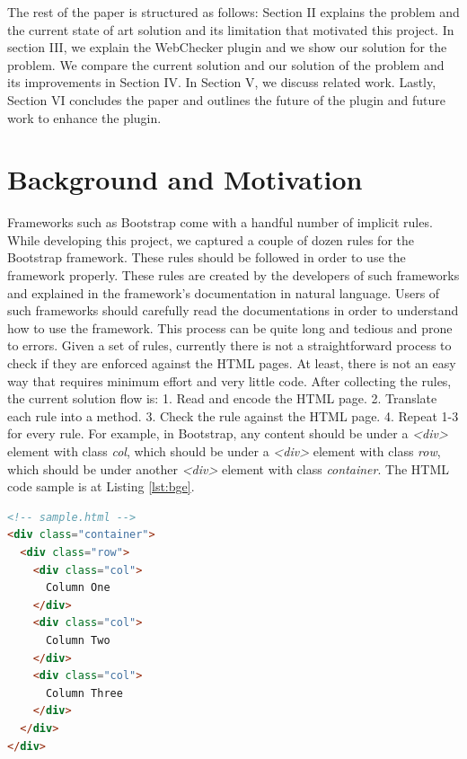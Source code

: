 \documentclass[conference]{IEEETran}
\begin{document}
The rest of the paper is structured as follows: Section II explains the problem and the current state of art solution and its limitation that motivated this project. In section III, we explain the WebChecker plugin and we show our solution for the problem. We compare the current solution and our solution of the problem and its improvements in Section IV. In Section V, we discuss related work. Lastly, Section VI concludes the paper and outlines the future of the plugin and future work to enhance the plugin.  

\section{Background and Motivation}

Frameworks such as Bootstrap come with a handful number of implicit rules. While developing this project, we captured a couple of dozen rules for the Bootstrap framework. These rules should be followed in order to use the framework properly. These rules are created by the developers of such frameworks and explained in the framework’s documentation in natural language. Users of such frameworks should carefully read the documentations in order to understand how to use the framework. This process can be quite long and tedious and prone to errors. Given a set of rules, currently there is not a straightforward process to check if they are enforced against the HTML pages. At least, there is not an easy way that requires minimum effort and very little code. After collecting the rules, the current solution flow is:
1. Read and encode the HTML page. 
2. Translate each rule into a method. 
3. Check the rule against the HTML page.
4. Repeat 1-3 for every rule.
For example, in Bootstrap, any content should be under a \textit{<div>} element with class \textit{col}, which should be under a \textit{<div>} element with class \textit{row}, which should be under another \textit{<div>} element with class \textit{container}. The HTML code sample is at Listing \ref{lst:bge}.  

\begin{lstlisting}[language=HTML, caption=Bootstrap Grid Example, label={lst:bge}]
<!-- sample.html -->
<div class="container">
  <div class="row">
    <div class="col">
      Column One
    </div>
    <div class="col">
      Column Two
    </div>
    <div class="col">
      Column Three
    </div>
  </div>
</div>
\end{lstlisting}
\end{document}
